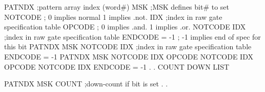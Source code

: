    PATNDX                ;pattern array index (word#)
   MSK                   ;MSK defines bit# to set
   NOTCODE               ; 0  implies normal  1  implies .not.
   IDX                   ;index in raw gate specification table
   OPCODE                ; 0  implies .and.  1  implies .or.
   NOTCODE
   IDX                   ;index in raw gate specification table
   ENDCODE = -1          ; -1  implies end of spec for this bit
   PATNDX
   MSK
   NOTCODE
   IDX                   ;index in raw gate specification table
   ENDCODE = -1
   PATNDX
   MSK
   NOTCODE
   IDX
   OPCODE
   NOTCODE
   IDX
   OPCODE
   NOTCODE
   IDX
   ENDCODE = -1
   .
   .
   COUNT DOWN LIST
 
   PATNDX  MSK  COUNT    ;down-count if bit is set
   .
   .
